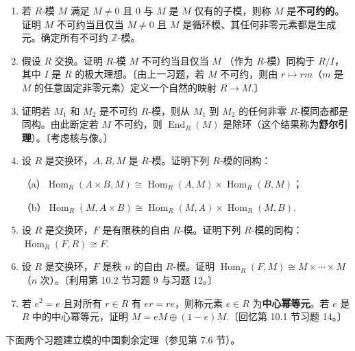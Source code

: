 \begin{enumerate}
\item 若 \(R\)-模 \(M\) 满足 \(M \neq 0\) 且 0 与 \(M\) 是 \(M\) 仅有的子模，则称 \(M\) 是\textbf{不可约的}。证明 \(M\) 不可约当且仅当 \(M \neq 0\) 且 \(M\) 是循环模、其任何非零元素都是生成元。确定所有不可约 \(\mathbb{Z}\)-模。

\item 假设 \(R\) 交换。证明 \(R\)-模 \(M\) 不可约当且仅当 \(M\) （作为 \(R\)-模）同构于 \(R/I\)，其中 \(I\) 是 \(R\) 的极大理想。〔由上一习题，若 \(M\) 不可约，则由 \(r \mapsto rm\)（\(m\) 是 \(M\) 的任意固定非零元素）定义一个自然的映射 \(R \to M\).〕

\item 证明若 \(M_1\) 和 \(M_2\) 是不可约 \(R\)-模，则从 \(M_1\) 到 \(M_2\) 的任何非零 \(R\)-模同态都是同构。由此断定若 \(M\) 不可约，则 \(\operatorname{End}_R(M)\) 是除环（这个结果称为\textbf{舒尔引理}）。〔考虑核与像。〕

\item 设 \(R\) 是交换环，\(A, B, M\) 是 \(R\)-模。证明下列 \(R\)-模的同构：

（a）\(\operatorname{Hom}_R(A \times B, M) \cong \operatorname{Hom}_R(A, M) \times \operatorname{Hom}_R(B, M)\)；

（b）\(\operatorname{Hom}_R(M, A \times B) \cong \operatorname{Hom}_R(M, A) \times \operatorname{Hom}_R(M, B)\).

\item 设 \(R\) 是交换环，\(F\) 是有限秩的自由 \(R\)-模。证明下列 \(R\)-模的同构：\(\operatorname{Hom}_R(F, R) \cong F\).

\item 设 \(R\) 是交换环，\(F\) 是秩 \(n\) 的自由 \(R\)-模。证明 \(\operatorname{Hom}_R(F, M) \cong M \times \cdots \times M\)（\(n\) 次）。〔利用第 10.2 节习题 9 与习题 12。〕

\item 若 \(e^2 = e\) 且对所有 \(r \in R\) 有 \(er = re\)，则称元素 \(e \in R\) 为\textbf{中心幂等元}。若 \(e\) 是 \(R\) 中的中心幂等元，证明 \(M = eM \oplus (1-e)M\).〔回忆第 10.1 节习题 14。〕
\end{enumerate}

\noindent 下面两个习题建立模的中国剩余定理（参见第 7.6 节）。

